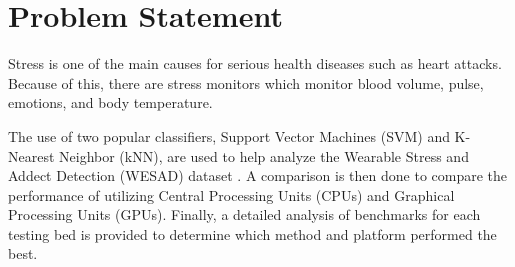 \section{Problem Statement}
\label{sec:Problem-Statement}

Stress is one of the main causes for serious health diseases such as heart attacks. 
Because of this, there are stress monitors which monitor blood volume, pulse, emotions, and 
body temperature.  

The use of two popular classifiers, Support Vector Machines (SVM) and K-Nearest Neighbor (kNN), 
are used to help analyze the Wearable Stress and Addect Detection (WESAD) dataset \cite{dataset}. 
A comparison is then done to compare the performance of utilizing Central Processing Units (CPUs) and 
Graphical Processing Units (GPUs). Finally, a detailed analysis of benchmarks for each testing bed is 
provided to determine which method and platform performed the best. 
